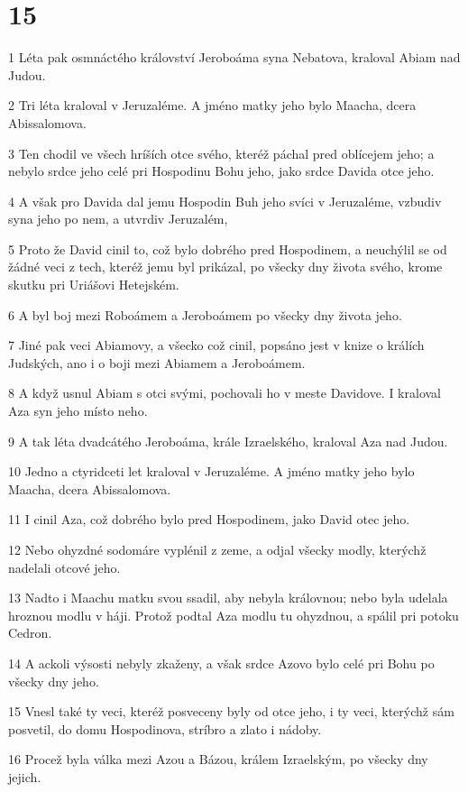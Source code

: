 \chapter{15}

\par 1 Léta pak osmnáctého království Jeroboáma syna Nebatova, kraloval Abiam nad Judou.
\par 2 Tri léta kraloval v Jeruzaléme. A jméno matky jeho bylo Maacha, dcera Abissalomova.
\par 3 Ten chodil ve všech hríších otce svého, kteréž páchal pred oblícejem jeho; a nebylo srdce jeho celé pri Hospodinu Bohu jeho, jako srdce Davida otce jeho.
\par 4 A však pro Davida dal jemu Hospodin Buh jeho svíci v Jeruzaléme, vzbudiv syna jeho po nem, a utvrdiv Jeruzalém,
\par 5 Proto že David cinil to, což bylo dobrého pred Hospodinem, a neuchýlil se od žádné veci z tech, kteréž jemu byl prikázal, po všecky dny života svého, krome skutku pri Uriášovi Hetejském.
\par 6 A byl boj mezi Roboámem a Jeroboámem po všecky dny života jeho.
\par 7 Jiné pak veci Abiamovy, a všecko což cinil, popsáno jest v knize o králích Judských, ano i o boji mezi Abiamem a Jeroboámem.
\par 8 A když usnul Abiam s otci svými, pochovali ho v meste Davidove. I kraloval Aza syn jeho místo neho.
\par 9 A tak léta dvadcátého Jeroboáma, krále Izraelského, kraloval Aza nad Judou.
\par 10 Jedno a ctyridceti let kraloval v Jeruzaléme. A jméno matky jeho bylo Maacha, dcera Abissalomova.
\par 11 I cinil Aza, což dobrého bylo pred Hospodinem, jako David otec jeho.
\par 12 Nebo ohyzdné sodomáre vyplénil z zeme, a odjal všecky modly, kterýchž nadelali otcové jeho.
\par 13 Nadto i Maachu matku svou ssadil, aby nebyla královnou; nebo byla udelala hroznou modlu v háji. Protož podtal Aza modlu tu ohyzdnou, a spálil pri potoku Cedron.
\par 14 A ackoli výsosti nebyly zkaženy, a však srdce Azovo bylo celé pri Bohu po všecky dny jeho.
\par 15 Vnesl také ty veci, kteréž posveceny byly od otce jeho, i ty veci, kterýchž sám posvetil, do domu Hospodinova, stríbro a zlato i nádoby.
\par 16 Procež byla válka mezi Azou a Bázou, králem Izraelským, po všecky dny jejich.
